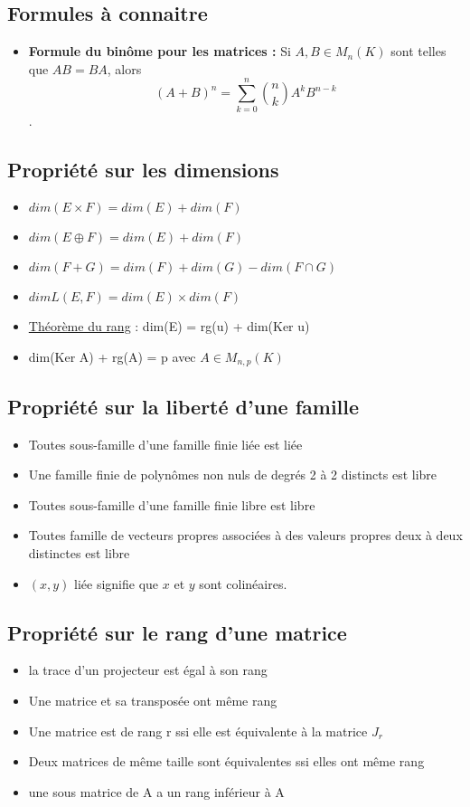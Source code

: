 \documentclass{article}
\begin{document}
\subsection{Formules à connaitre}
\begin{itemize}[label=$\ast$]
	\item \textbf{Formule du binôme pour les matrices :} Si \( A, B \in M_n(K) \) sont telles que \( AB = BA \), alors \[ (A + B)^n = \sum_{k=0}^{n} \binom{n}{k} A^k B^{n-k} \].

\end{itemize}

\subsection{Propriété sur les dimensions}
\begin{itemize}[label=$\ast$]
	\item \( dim(E \times F) = dim(E) + dim(F) \)
	\item \( dim(E \oplus F) = dim(E) + dim(F) \)
	\item \( dim(F + G) = dim(F) + dim(G) - dim(F \cap G) \)
	\item \(dim L(E,F) = dim(E) \times dim(F) \)
	\item \underline{Théorème du rang} : dim(E)  = rg(u) + dim(Ker u)
	\item dim(Ker A) + rg(A) = p avec \(A \in M_{n,p}(K)\)
\end{itemize}

\subsection{Propriété sur la liberté d'une famille}
\begin{itemize}[label=$\ast$]
	\item Toutes sous-famille d'une famille finie liée est liée
	\item Une famille finie de polynômes non nuls de degrés 2 à 2 distincts est libre
	\item Toutes sous-famille d'une famille finie libre est libre
	\item  Toutes famille de vecteurs propres associées à des valeurs propres deux à deux distinctes est libre
	\item \( (x,y) \) liée signifie que \( x \) et \( y \) sont colinéaires.
\end{itemize}

\subsection{Propriété sur le rang d'une matrice}
\begin{itemize}[label=$\ast$]
	\item la trace d'un projecteur est égal à son rang
	\item Une matrice et sa transposée ont même rang
	\item Une matrice est de rang r ssi elle est équivalente à la matrice \( J_r \)
	\item Deux matrices de même taille sont équivalentes ssi elles ont même rang
	\item une sous matrice de A a un rang inférieur à A
\end{itemize}
\end{document}
